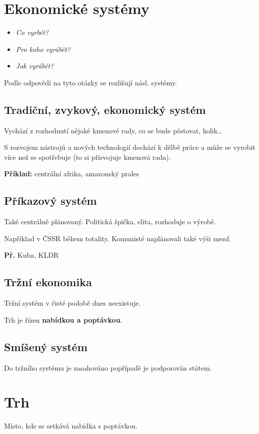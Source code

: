 \documentclass[10pt,a4paper,
twoside,%
]{report}
\begin{document}
\section{Ekonomické systémy}

\begin{itemize}
\item\emph{Co vyrbět?}
\item\emph{Pro koho vyrábět?}
\item\emph{Jak vyrábět?}
\end{itemize}

Podle odpovědí na tyto otázky se rozlišují násl. systémy.

\subsection{Tradiční, zvykový, ekonomický systém}

Vychází z rozhodnutí nějaké kmenové rady, co se bude pěstovat, kolik\dots

S rozvojem nástrojů a nových technologií dochází k dělbě práce a může se vyrobit více než se spotřebuje (to si přisvojuje kmenová rada).

\textbf{Příklad:} centrální afrika, amazonský prales

\subsection{Příkazový systém}

Také centrálně plánovaný. Politická špička, elita, rozhoduje o výrobě.

Například v ČSSR během totality. Komunisté naplánovali také výši mezd.

\textbf{Př.} Kuba, KLDR

\subsection{Tržní ekonomika}

Tržní systém v čisté podobě dnes neexistuje.

Trh je řízen \textbf{nabídkou a poptávkou}. 

\subsection{Smíšený systém}

Do tržního systému je zasahováno popřípadě je podporován státem.

\section{Trh}
\textsf{Místo, kde se setkává nabídka s poptávkou.}
\end{document}
